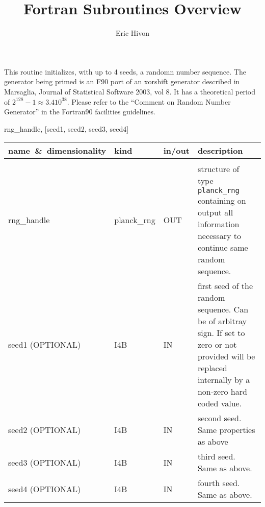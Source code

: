 
\sloppy


\title{\healpix Fortran Subroutines Overview}
 \section[rand\_init]{ }
\label{sub:rand_init}
\author{Eric Hivon}

\begin{facility}
{This routine initializes, with up to 4 seeds, a randomn number sequence. 
 The generator being primed is an F90 port of an xorshift generator described
  in Marsaglia, Journal of Statistical Software 2003, vol 8.
  It has a theoretical period of $2^{128} - 1 \approx 3.4 10^{38}$.
Please refer to the ``Comment on Random Number Generator''
  in the Fortran90 facilities guidelines.
}
{\modRngmod}
\end{facility}

\begin{f90format}
{rng\_handle, [seed1, seed2, seed3, seed4]}
\end{f90format}

\begin{arguments}
{
\begin{tabular}{p{0.3\hsize} p{0.15\hsize} p{0.1\hsize} p{0.35\hsize}} \hline  
\textbf{name~\&~dimensionality} & \textbf{kind} & \textbf{in/out} & \textbf{description} \\ \hline
                   &   &   &                           \\ %
rng\_handle & planck\_rng & OUT & structure of type {\tt planck\_rng}
                   containing on output all information necessary to continue same random sequence. \\ 
seed1 (OPTIONAL)& I4B & IN & first seed of the random sequence. Can be of arbitray
                   sign. If set to
                   zero or not provided will be replaced internally by a non-zero hard coded value.   \\
seed2 (OPTIONAL)& I4B & IN & second seed. Same properties as above  \\
seed3 (OPTIONAL)& I4B & IN & third seed. Same as above.  \\
seed4 (OPTIONAL)& I4B & IN & fourth seed. Same as above.  \\
\end{tabular}
}
\end{arguments}


